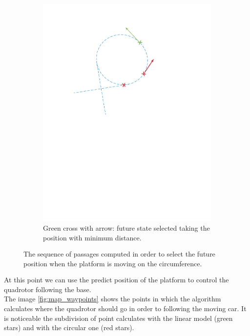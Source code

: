 \begin{itemize}
\begin{figure}[!htbp]
\begin{subfigure}[b]{0.45\textwidth}
        \includegraphics[width=\textwidth]{img/circular_movment8.pdf}
        \caption{Green cross with arrow: future state selected taking the position with minimum distance.}
        \label{fig:eight}
   \end{subfigure}
  \caption{The sequence of passages computed in order to select the future position when the platform is moving on the circumference.}
  \label{fig:sequence_find_next_position_circumference}
\end{figure} 
\end{itemize}

\newpage 
At this point we can use the predict position of the platform to control the quadrotor following the base.\\

The image \ref{fig:map_waypoints} shows the points in which the algorithm calculates where the quadrotor should go in order to following the moving car. It is noticeable the subdivision of point calculates with the linear model (green stars) and with the circular one (red stars).

